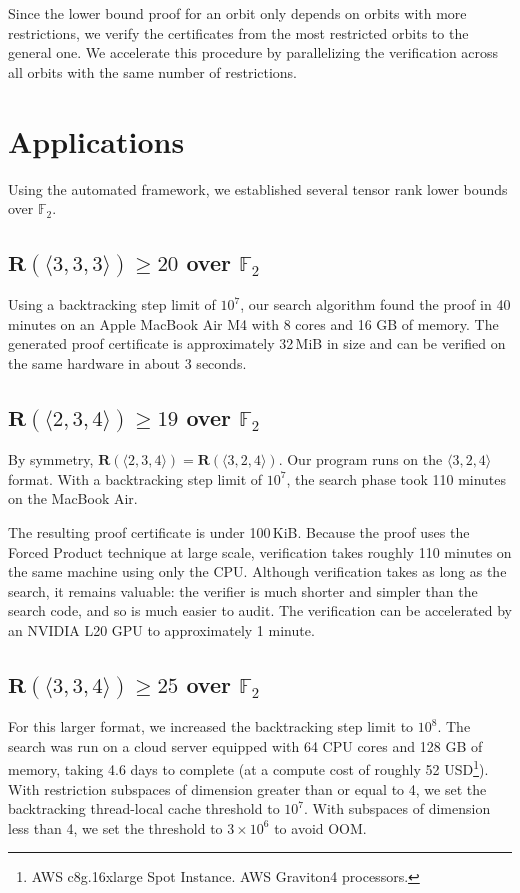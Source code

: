 \documentclass[11pt]{article}
\begin{document}
Since the lower bound proof for an orbit only depends on orbits with more restrictions, we verify the certificates from the most restricted orbits to the general one. We accelerate this procedure by parallelizing the verification across all orbits with the same number of restrictions.

\section{Applications}\label{sec:applications}

Using the automated framework, we established several tensor rank lower bounds over $\mathbb{F}_2$.

\subsection{$\mathbf{R}(\langle 3,3,3\rangle)\ge 20$ over $\mathbb{F}_2$}
Using a backtracking step limit of $10^7$, our search algorithm found the proof in 40 minutes on an Apple MacBook Air M4 with 8 cores and 16 GB of memory. The generated proof certificate is approximately 32\,MiB in size and can be verified on the same hardware in about 3 seconds.

\subsection{$\mathbf{R}(\langle 2,3,4\rangle)\ge 19$ over $\mathbb{F}_2$}
By symmetry, $\mathbf{R}(\langle 2,3,4\rangle) = \mathbf{R}(\langle 3,2,4\rangle)$. Our program runs on the $\langle 3,2,4\rangle$ format. With a backtracking step limit of $10^7$, the search phase took 110 minutes on the MacBook Air.

The resulting proof certificate is under 100\,KiB. Because the proof uses the Forced Product technique at large scale, verification takes roughly 110 minutes on the same machine using only the CPU. Although verification takes as long as the search, it remains valuable: the verifier is much shorter and simpler than the search code, and so is much easier to audit.
The verification can be accelerated by an NVIDIA L20 GPU to approximately 1 minute.

\subsection{$\mathbf{R}(\langle 3,3,4\rangle)\ge 25$ over $\mathbb{F}_2$}
For this larger format, we increased the backtracking step limit to $10^8$. The search was run on a cloud server equipped with 64 CPU cores and 128 GB of memory, taking 4.6 days to complete (at a compute cost of roughly 52 USD\footnote{AWS c8g.16xlarge Spot Instance. AWS Graviton4 processors.\label{fn:aws-c8g-16xlarge}}).
With restriction subspaces of dimension greater than or equal to 4, we set the backtracking thread-local cache threshold to $10^7$. With subspaces of dimension less than 4, we set the threshold to $3\times 10^6$ to avoid OOM.
\end{document}
